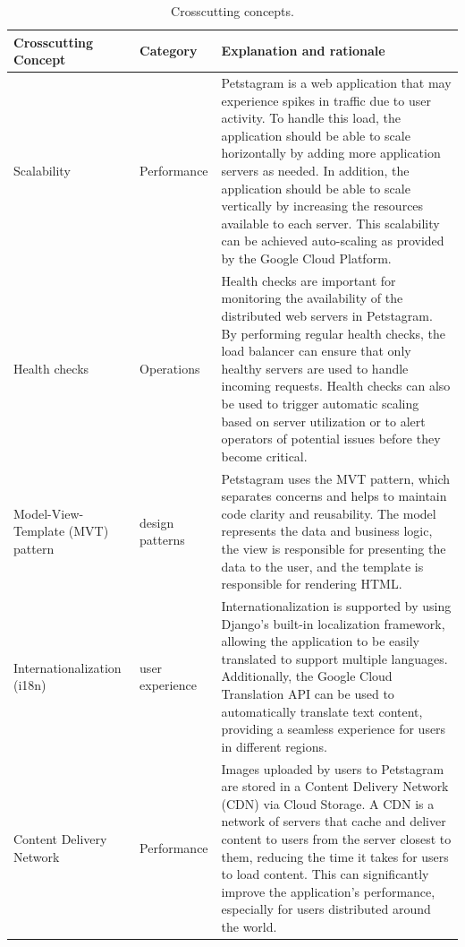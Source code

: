 \documentclass[lettersize,journal]{IEEEtran}
\begin{document}
\newpage
\clearpage
\begin{table}[htbp]
    \caption{Crosscutting concepts.}
    \label{table:tbl_Crosscutting_Conceptss} 
    \centering
    \begin{tabular}{ |m{3cm}|m{2cm}|m{11cm}| } 
        \hline
        Crosscutting Concept&Category&Explanation and rationale\\
        \hline
        Scalability&Performance&Petstagram is a web application that may experience spikes in traffic due to user activity. To handle this load, the application should be able to scale horizontally by adding more application servers as needed. In addition, the application should be able to scale vertically by increasing the resources available to each server. This scalability can be achieved auto-scaling as provided by the Google Cloud Platform.\\
        \hline
       Health checks&Operations&Health checks are important for monitoring the availability of the distributed web servers in Petstagram. By performing regular health checks, the load balancer can ensure that only healthy servers are used to handle incoming requests. Health checks can also be used to trigger automatic scaling based on server utilization or to alert operators of potential issues before they become critical.
\\
        \hline
        Model-View-Template (MVT) pattern&design patterns&Petstagram uses the MVT pattern, which separates concerns and helps to maintain code clarity and reusability. The model represents the data and business logic, the view is responsible for presenting the data to the user, and the template is responsible for rendering HTML.\\
        \hline
        Internationalization (i18n)&user experience&Internationalization is supported by using Django's built-in localization framework, allowing the application to be easily translated to support multiple languages. Additionally, the Google Cloud Translation API can be used to automatically translate text content, providing a seamless experience for users in different regions.\\
        \hline
        Content Delivery Network&Performance&Images uploaded by users to Petstagram are stored in a Content Delivery Network (CDN) via Cloud Storage. A CDN is a network of servers that cache and deliver content to users from the server closest to them, reducing the time it takes for users to load content. This can significantly improve the application's performance, especially for users distributed around the world.\\

\end{tabular}
\end{table}
\end{document}
